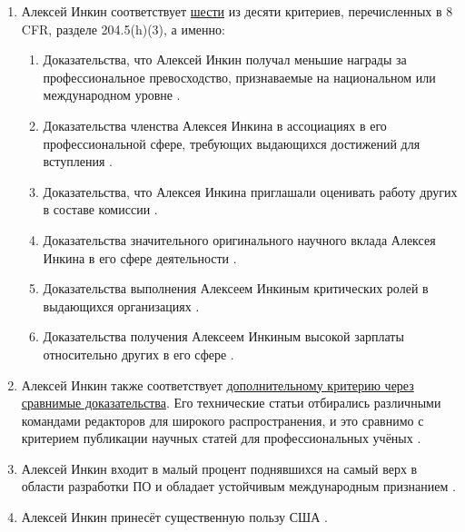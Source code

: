 \begin{enumerate}

    \item Алексей Инкин соответствует \underline{шести} из десяти критериев, перечисленных в 8
    CFR, разделе 204.5(h)(3), а именно:

    \begin{enumerate}[label=\roman*.]

        \item Доказательства, что Алексей Инкин получал меньшие награды за профессиональное превосходство,
        признаваемые на национальном или международном уровне .

        \item Доказательства членства Алексея Инкина в ассоциациях в его профессиональной сфере,
        требующих выдающихся достижений для вступления .

        \addtocounter{enumii}{1} %
        \item Доказательства, что Алексея Инкина приглашали оценивать работу других в составе комиссии
        .

        \item Доказательства значительного оригинального научного вклада Алексея Инкина
        в его сфере деятельности .

        \addtocounter{enumii}{2} %
        \item Доказательства выполнения Алексеем Инкиным критических ролей в выдающихся организациях
        .

        \item Доказательства получения Алексеем Инкиным высокой зарплаты относительно других в его сфере
        .

    \end{enumerate}

    \item Алексей Инкин также соответствует \ul{дополнительному критерию через сравнимые доказательства}.
    Его технические статьи отбирались различными командами редакторов
    для широкого распространения,
    и это сравнимо с критерием публикации научных статей для профессиональных учёных .

    \item Алексей Инкин входит в малый процент поднявшихся на самый верх в области разработки ПО
    и обладает устойчивым международным признанием .

    \item Алексей Инкин принесёт существенную пользу США .

\end{enumerate}


